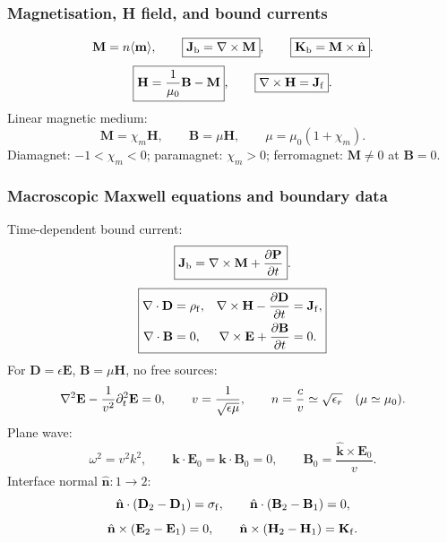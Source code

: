 \subsubsection*{Magnetisation, H field, and bound currents}
\[
\mathbf M=n\langle\mathbf m\rangle,\qquad
\boxed{\mathbf J_{\rm b}=\nabla\times\mathbf M},\qquad
\boxed{\mathbf K_{\rm b}=\mathbf M\times\hat{\mathbf n}}.
\]
\[
\boxed{\mathbf H=\frac{1}{\mu_0}\mathbf B-\mathbf M},\qquad
\boxed{\nabla\times\mathbf H=\mathbf J_{\rm f}}.
\]
Linear magnetic medium:
\[
\mathbf M=\chi_m\mathbf H,\qquad
\mathbf B=\mu\mathbf H,\qquad
\mu=\mu_0(1+\chi_m).
\]
Diamagnet: $-1<\chi_m<0$; paramagnet: $\chi_m>0$; ferromagnet: $\mathbf M\neq0$ at $\mathbf B=0$.

\subsubsection*{Macroscopic Maxwell equations and boundary data}
Time-dependent bound current:
\[
\boxed{\mathbf J_{\rm b}=\nabla\times\mathbf M+\frac{\partial\mathbf P}{\partial t}}.
\]
\[
\boxed{
\begin{aligned}
\nabla\cdot\mathbf D&=\rho_{\rm f},&
\nabla\times\mathbf H-\frac{\partial\mathbf D}{\partial t}&=\mathbf J_{\rm f},\\
\nabla\cdot\mathbf B&=0,&
\nabla\times\mathbf E+\frac{\partial\mathbf B}{\partial t}&=0.
\end{aligned}}
\]
For $\mathbf D=\epsilon\mathbf E$, $\mathbf B=\mu\mathbf H$, no free sources:
\[
\nabla^2\mathbf E-\frac{1}{v^2}\partial_t^2\mathbf E=0,\qquad
v=\frac{1}{\sqrt{\epsilon\mu}},\qquad n=\frac{c}{v}\simeq\sqrt{\epsilon_r}\quad(\mu\simeq\mu_0).
\]
Plane wave:
\[
\omega^2=v^2k^2,\qquad \mathbf k\cdot\mathbf E_0=\mathbf k\cdot\mathbf B_0=0,\qquad
\mathbf B_0=\frac{\hat{\mathbf k}\times\mathbf E_0}{v}.
\]
Interface normal $\hat{\mathbf n}:1\to2$:
\[
\hat{\mathbf n}\cdot(\mathbf D_2-\mathbf D_1)=\sigma_{\rm f},\qquad
\hat{\mathbf n}\cdot(\mathbf B_2-\mathbf B_1)=0,
\]
\[
\hat{\mathbf n}\times(\mathbf E_2-\mathbf E_1)=0,\qquad
\hat{\mathbf n}\times(\mathbf H_2-\mathbf H_1)=\mathbf K_{\rm f}.
\]

